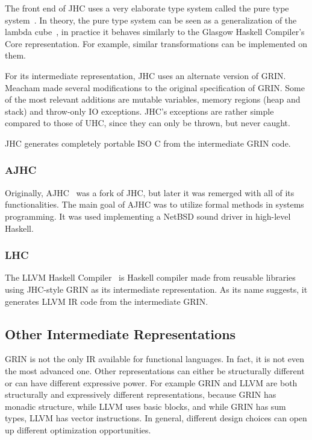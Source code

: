 \documentclass[main.tex]{subfiles}
\begin{document}
	The front end of JHC uses a very elaborate type system called the pure type system~\cite{pts-berardi, pts-terlouw}. In theory, the pure type system can be seen as a generalization of the lambda cube~\cite{lambda-cube}, in practice it behaves similarly to the Glasgow Haskell Compiler's Core representation. For example, similar transformations can be implemented on them.
	
	For its intermediate representation, JHC uses an alternate version of GRIN. Meacham made several modifications to the original specification of GRIN. Some of the most relevant additions are mutable variables, memory regions (heap and stack) and throw-only IO exceptions. JHC's exceptions are rather simple compared to those of UHC, since they can only be thrown, but never caught.
	
	JHC generates completely portable ISO C from the intermediate GRIN code.
	
	\subsubsection{AJHC}
	
	Originally, AJHC~\cite{ajhc} was a fork of JHC, but later it was remerged with all of its functionalities. The main goal of AJHC was to utilize formal methods in systems programming. It was used implementing a NetBSD sound driver in high-level Haskell.
	
	\subsubsection{LHC}
	
	The LLVM Haskell Compiler~\cite{lhc} is Haskell compiler made from reusable libraries using JHC-style GRIN as its intermediate representation. As its name suggests, it generates LLVM IR code from the intermediate GRIN.
	
	\subsection{Other Intermediate Representations}
	
	GRIN is not the only IR available for functional languages. In fact, it is not even the most advanced one. Other representations can either be structurally different or can have different expressive power. For example GRIN and LLVM are both structurally and expressively different representations, because GRIN has monadic structure, while LLVM uses basic blocks, and while GRIN has sum types, LLVM has vector instructions. In general, different design choices can open up different optimization opportunities.
	
\end{document}
